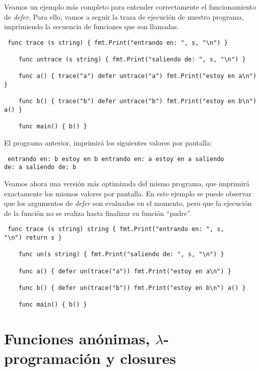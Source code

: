 Veamos un ejemplo más completo para entender correctamente el funcionamiento de
\textit{defer}. Para ello, vamos a seguir la traza de ejecución de nuestro
programa, imprimiendo la secuencia de funciones que son llamadas.

\begin{verbatim} func trace (s string) { fmt.Print("entrando en: ", s, "\n") }

	func untrace (s string) { fmt.Print("saliendo de: ", s, "\n") }

	func a() { trace("a") defer untrace("a") fmt.Print("estoy en a\n") }

	func b() { trace("b") defer untrace("b") fmt.Print("estoy en b\n") a() }

	func main() { b() } \end{verbatim}

El programa anterior, imprimirá los siguientes valores por pantalla:

\begin{verbatim} entrando en: b estoy en b entrando en: a estoy en a saliendo
de: a saliendo de: b \end{verbatim}

Veamos ahora una versión más optimizada del mismo programa, que imprimirá
exactamente los mismos valores por pantalla. En este ejemplo se puede observar
que los argumentos de \textit{defer} son evaluados en el momento, pero que la
ejecución de la función no se realiza hasta finalizar su función ``padre''.
\clearpage
\begin{verbatim} func trace (s string) string { fmt.Print("entrando en: ", s,
"\n") return s }

	func un(s string) { fmt.Print("saliendo de: ", s, "\n") }

	func a() { defer un(trace("a")) fmt.Print("estoy en a\n") }

	func b() { defer un(trace("b")) fmt.Print("estoy en b\n") a() }

	func main() { b() } \end{verbatim}

\section{Funciones anónimas, $\lambda$-programación y closures}

